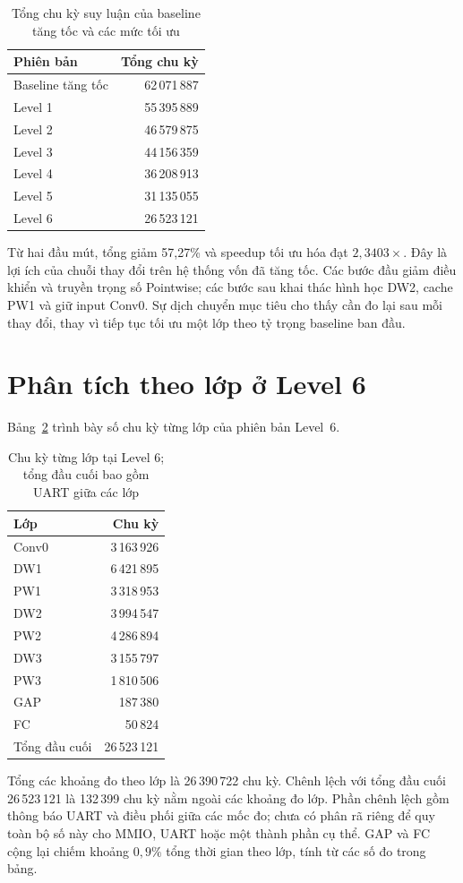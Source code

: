 \begin{table}[!ht]
\renewcommand{\arraystretch}{1.12}
\centering
\caption{Tổng chu kỳ suy luận của baseline tăng tốc và các mức tối ưu}
\label{tab:levels}
\begin{tabular}{lr}
\hline
Phiên bản & Tổng chu kỳ \\
\hline
Baseline tăng tốc & 62\,071\,887 \\
Level 1 & 55\,395\,889 \\
Level 2 & 46\,579\,875 \\
Level 3 & 44\,156\,359 \\
Level 4 & 36\,208\,913 \\
Level 5 & 31\,135\,055 \\
Level 6 & 26\,523\,121 \\
\hline
\end{tabular}
\end{table}
Từ hai đầu mút, tổng giảm 57,27\% và speedup tối ưu hóa đạt $2{,}3403\times$. Đây là lợi ích của chuỗi thay đổi trên hệ thống vốn đã tăng tốc. Các bước đầu giảm điều khiển và truyền trọng số Pointwise; các bước sau khai thác hình học DW2, cache PW1 và giữ input Conv0. Sự dịch chuyển mục tiêu cho thấy cần đo lại sau mỗi thay đổi, thay vì tiếp tục tối ưu một lớp theo tỷ trọng baseline ban đầu.

\section{Phân tích theo lớp ở Level 6}
Bảng~\ref{tab:level6-layers} trình bày số chu kỳ từng lớp của phiên bản Level~6.

\begin{table}[!ht]
\renewcommand{\arraystretch}{1.12}
\centering
\caption{Chu kỳ từng lớp tại Level 6; tổng đầu cuối bao gồm UART giữa các lớp}
\label{tab:level6-layers}
\begin{tabular}{lr}
\hline
Lớp & Chu kỳ \\
\hline
Conv0 & 3\,163\,926 \\
DW1 & 6\,421\,895 \\
PW1 & 3\,318\,953 \\
DW2 & 3\,994\,547 \\
PW2 & 4\,286\,894 \\
DW3 & 3\,155\,797 \\
PW3 & 1\,810\,506 \\
GAP & 187\,380 \\
FC & 50\,824 \\
\hline
Tổng đầu cuối & 26\,523\,121 \\
\hline
\end{tabular}
\end{table}
Tổng các khoảng đo theo lớp là 26\,390\,722 chu kỳ. Chênh lệch với tổng đầu cuối 26\,523\,121 là 132\,399 chu kỳ nằm ngoài các khoảng đo lớp. Phần chênh lệch gồm thông báo UART và điều phối giữa các mốc đo; chưa có phân rã riêng để quy toàn bộ số này cho MMIO, UART hoặc một thành phần cụ thể. GAP và FC cộng lại chiếm khoảng $0{,}9\%$ tổng thời gian theo lớp, tính từ các số đo trong bảng.

